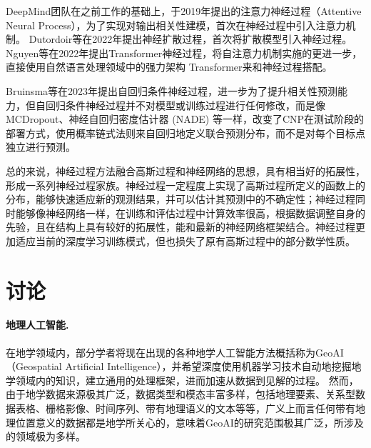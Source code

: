 \documentclass[final]{cvpr}
\newcommand{\mypara}[1]{\paragraph{#1.}}
\begin{document}
DeepMind团队在之前工作的基础上，于2019年提出的注意力神经过程（Attentive Neural Process），为了实现对输出相关性建模，首次在神经过程中引入注意力机制\cite{kim2019attentive}。
Dutordoir等在2022年提出神经扩散过程，首次将扩散模型引入神经过程\cite{dutordoir2022neural}。
Nguyen等在2022年提出Transformer神经过程，将自注意力机制实施的更进一步，直接使用自然语言处理领域中的强力架构 Transformer来和神经过程搭配\cite{nguyen2022transformer}。

Bruinsma等在2023年提出自回归条件神经过程，进一步为了提升相关性预测能力，但自回归条件神经过程并不对模型或训练过程进行任何修改，而是像 MCDropout、神经自回归密度估计器 (NADE) 等一样，改变了CNP在测试阶段的部署方式，使用概率链式法则来自回归地定义联合预测分布，而不是对每个目标点独立进行预测。\cite{bruinsma2023autoregressive}

总的来说，神经过程方法融合高斯过程和神经网络的思想，具有相当好的拓展性，形成一系列神经过程家族。神经过程一定程度上实现了高斯过程所定义的函数上的分布，能够快速适应新的观测结果，并可以估计其预测中的不确定性；神经过程同时能够像神经网络一样，在训练和评估过程中计算效率很高，根据数据调整自身的先验，且在结构上具有较好的拓展性，能和最新的神经网络框架结合。神经过程更加适应当前的深度学习训练模式，但也损失了原有高斯过程中的部分数学性质。



\section{讨论}\label{sec:debate}
\mypara{地理人工智能}
在地学领域内，部分学者将现在出现的各种地学人工智能方法概括称为GeoAI（Geospatial Artificial Intelligence）\cite{Janowicz_Gao_McKenzie_Hu_Bhaduri_2020}，并希望深度使用机器学习技术自动地挖掘地学领域内的知识，建立通用的处理框架，进而加速从数据到见解的过程。
然而，由于地学数据来源极其广泛，数据类型和模态丰富多样，包括地理要素、关系型数据表格、栅格影像、时间序列、带有地理语义的文本等等\cite{graham2013geography}，广义上而言任何带有地理位置意义的数据都是地学所关心的\cite{lee2015geospatial}，意味着GeoAI的研究范围极其广泛，所涉及的领域极为多样。
\end{document}
